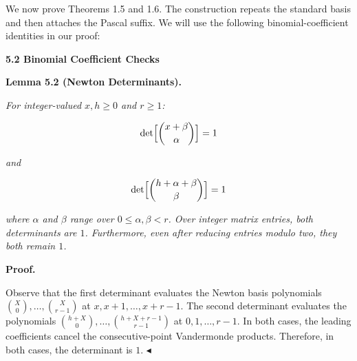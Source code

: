 \documentclass[10pt,a4paper]{article}
\begin{document}
We now prove Theorems 1.5 and 1.6. The construction repeats the standard basis and then attaches the Pascal suffix. We will use the following binomial-coefficient identities in our proof:\par






\par\medskip\noindent\textbf{
5.2 Binomial Coefficient Checks}\par





\par\medskip\noindent\textbf{
\textbf{Lemma 5.2}\textbf{ }(Newton Determinants)\textbf{.}
}\par



\emph{For integer-valued $x,h\geq 0$ and $r\geq 1$:}\par


\[\begin{gathered}
\det\Bigl[\binom{x+\beta}{\alpha}\Bigr]=1
\end{gathered}\]


\emph{and}\par


\[\begin{gathered}
\det\Bigl[\binom{h+\alpha+\beta}{\beta}\Bigr]=1
\end{gathered}\]


\emph{where $\alpha$ and $\beta$ range over $0\leq\alpha,\beta<r$. Over integer matrix entries, both determinants are $1$. Furthermore, even after reducing entries modulo two, they both remain $1$.}\par






\par\medskip\noindent\textbf{Proof.}\par




Observe that the first determinant evaluates the Newton basis polynomials $\binom{X}{0},\ldots,\binom{X}{r-1}$ at $x,x+1,\ldots,x+r-1$. The second determinant evaluates the polynomials $\binom{h+X}{0},\ldots,\binom{h+X+r-1}{r-1}$ at $0,1,\ldots,r-1$. In both cases, the leading coefficients cancel the consecutive-point Vandermonde products. Therefore, in both cases, the determinant is $1$.
$\blacktriangleleft$\par
\end{document}

